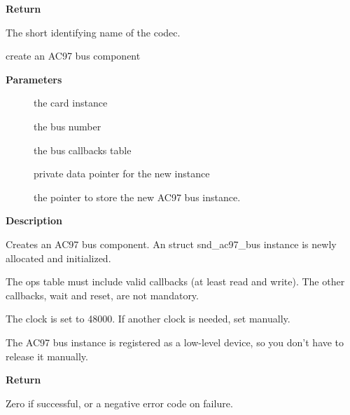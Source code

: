 \documentclass[a4paper,8pt,english]{sphinxmanual}
\begin{document}
\textbf{Return}

The short identifying name of the codec.

\begin{fulllineitems}
\label{sound/kernel-api/alsa-driver-api:c.snd_ac97_bus}
create an AC97 bus component

\end{fulllineitems}


\textbf{Parameters}
\begin{description}
\item[{}] \leavevmode
the card instance

\item[{}] \leavevmode
the bus number

\item[{}] \leavevmode
the bus callbacks table

\item[{}] \leavevmode
private data pointer for the new instance

\item[{}] \leavevmode
the pointer to store the new AC97 bus instance.

\end{description}

\textbf{Description}

Creates an AC97 bus component.  An struct snd\_ac97\_bus instance is newly
allocated and initialized.

The ops table must include valid callbacks (at least read and
write).  The other callbacks, wait and reset, are not mandatory.

The clock is set to 48000.  If another clock is needed, set
 manually.

The AC97 bus instance is registered as a low-level device, so you don't
have to release it manually.

\textbf{Return}

Zero if successful, or a negative error code on failure.
\end{document}
